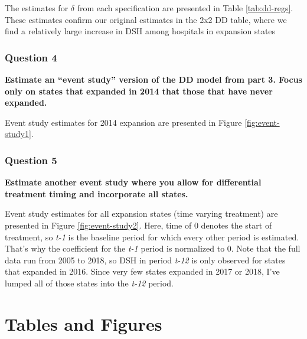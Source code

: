 \documentclass[
  12pt,
]{article}
\begin{document}
The estimates for \(\delta\) from each specification are presented in Table \ref{tab:dd-regs}. These estimates confirm our original estimates in the 2x2 DD table, where we find a relatively large increase in DSH among hospitals in expansion states

\hypertarget{question-4}{%
\subsubsection{Question 4}\label{question-4}}

\textbf{Estimate an ``event study'' version of the DD model from part 3. Focus only on states that expanded in 2014 that those that have never expanded.}

Event study estimates for 2014 expansion are presented in Figure \ref{fig:event-study1}.

\hypertarget{question-5}{%
\subsubsection{Question 5}\label{question-5}}

\textbf{Estimate another event study where you allow for differential treatment timing and incorporate all states.}

Event study estimates for all expansion states (time varying treatment) are presented in Figure \ref{fig:event-study2}. Here, time of 0 denotes the start of treatment, so \emph{t-1} is the baseline period for which every other period is estimated. That's why the coefficient for the \emph{t-1} period is normalized to 0. Note that the full data run from 2005 to 2018, so DSH in period \emph{t-12} is only observed for states that expanded in 2016. Since very few states expanded in 2017 or 2018, I've lumped all of those states into the \emph{t-12} period.

\newpage
{}

\hypertarget{tables-and-figures}{%
\section{Tables and Figures}\label{tables-and-figures}}
\end{document}
